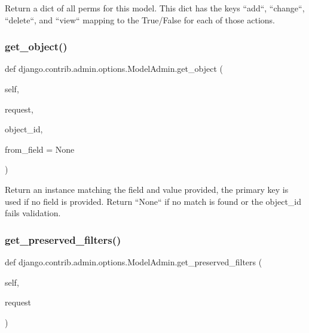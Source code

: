 \begin{DoxyVerb}Return a dict of all perms for this model. This dict has the keys
``add``, ``change``, ``delete``, and ``view`` mapping to the True/False
for each of those actions.
\end{DoxyVerb}
 \mbox{\label{classdjango_1_1contrib_1_1admin_1_1options_1_1_model_admin_a9d8fe5dc46588f2e6a68135c73c1487f}} 
\subsubsection{\texorpdfstring{get\+\_\+object()}{get\_object()}}
{\footnotesize\ttfamily def django.\+contrib.\+admin.\+options.\+Model\+Admin.\+get\+\_\+object (\begin{DoxyParamCaption}\item[{}]{self,  }\item[{}]{request,  }\item[{}]{object\+\_\+id,  }\item[{}]{from\+\_\+field = {\ttfamily None} }\end{DoxyParamCaption})}

\begin{DoxyVerb}Return an instance matching the field and value provided, the primary
key is used if no field is provided. Return ``None`` if no match is
found or the object_id fails validation.
\end{DoxyVerb}
 \mbox{\label{classdjango_1_1contrib_1_1admin_1_1options_1_1_model_admin_a7ef4e53bb5ae008991aa2bb9ce5e4810}} 
\subsubsection{\texorpdfstring{get\+\_\+preserved\+\_\+filters()}{get\_preserved\_filters()}}
{\footnotesize\ttfamily def django.\+contrib.\+admin.\+options.\+Model\+Admin.\+get\+\_\+preserved\+\_\+filters (\begin{DoxyParamCaption}\item[{}]{self,  }\item[{}]{request }\end{DoxyParamCaption})}

